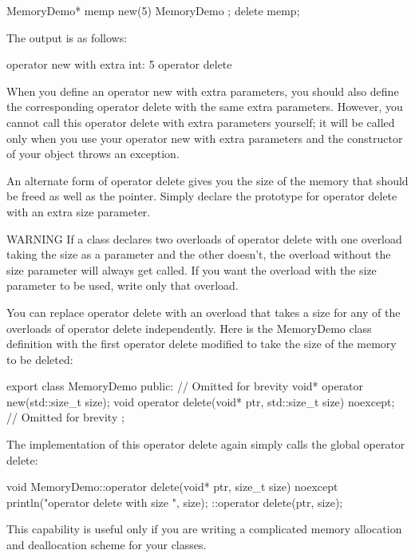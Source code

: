 \begin{cpp}
MemoryDemo* memp { new(5) MemoryDemo{} };
delete memp;
\end{cpp}

The output is as follows:

\begin{shell}
operator new with extra int: 5
operator delete
\end{shell}

When you define an operator new with extra parameters, you should also define the corresponding operator delete with the same extra parameters. However, you cannot call this operator delete with extra parameters yourself; it will be called only when you use your operator new with extra parameters and the constructor of your object throws an exception.


An alternate form of operator delete gives you the size of the memory that should be freed as well as the pointer. Simply declare the prototype for operator delete with an extra size parameter.

\begin{myWarning}{WARNING}
If a class declares two overloads of operator delete with one overload taking the size as a parameter and the other doesn’t, the overload without the size parameter will always get called. If you want the overload with the size parameter to be used, write only that overload.
\end{myWarning}

You can replace operator delete with an overload that takes a size for any of the overloads of operator delete independently. Here is the MemoryDemo class definition with the first operator delete modified to take the size of the memory to be deleted:

\begin{cpp}
export class MemoryDemo
{
    public:
        // Omitted for brevity
        void* operator new(std::size_t size);
        void operator delete(void* ptr, std::size_t size) noexcept;
        // Omitted for brevity
};
\end{cpp}

The implementation of this operator delete again simply calls the global operator delete:

\begin{cpp}
void MemoryDemo::operator delete(void* ptr, size_t size) noexcept
{
    println("operator delete with size {}", size);
    ::operator delete(ptr, size);
}
\end{cpp}

This capability is useful only if you are writing a complicated memory allocation and deallocation scheme for your classes.




